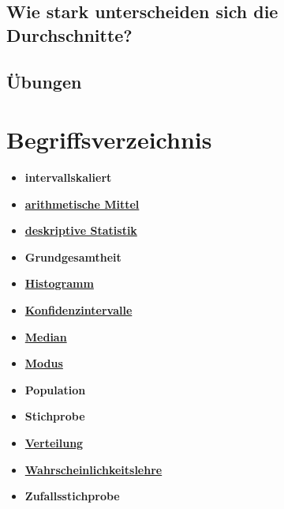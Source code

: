 \documentclass[
]{book}
\providecommand{\tightlist}{%
  \setlength{\itemsep}{0pt}\setlength{\parskip}{0pt}}
\theoremstyle{definition}
\theoremstyle{definition}
\theoremstyle{definition}
\theoremstyle{definition}
\theoremstyle{remark}
\begin{document}
\section{Wie stark unterscheiden sich die Durchschnitte?}\label{wie-stark-unterscheiden-sich-die-durchschnitte}

\section{Übungen}\label{uxfcbungen-4}

\chapter*{Begriffsverzeichnis}\label{begriffsverzeichnis}

\begin{itemize}
\tightlist
\item
  \textbf{intervallskaliert}
\item
  \hyperref[NA]{\textbf{arithmetische Mittel}}
\item
  \hyperref[NA]{\textbf{deskriptive Statistik}}
\item
  \textbf{Grundgesamtheit}
\item
  \hyperref[NA]{\textbf{Histogramm}}
\item
  \hyperref[NA]{\textbf{Konfidenzintervalle}}
\item
  \hyperref[NA]{\textbf{Median}}
\item
  \hyperref[NA]{\textbf{Modus}}
\item
  \textbf{Population}
\item
  \textbf{Stichprobe}
\item
  \hyperref[NA]{\textbf{Verteilung}}
\item
  \hyperref[NA]{\textbf{Wahrscheinlichkeitslehre}}
\item
  \textbf{Zufallsstichprobe}
\end{itemize}

  
\end{document}
